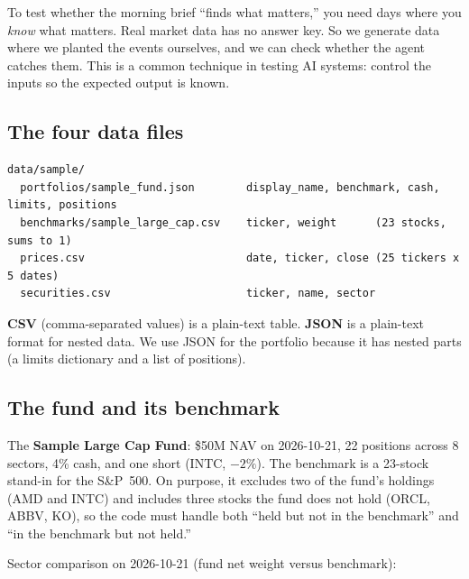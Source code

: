 \documentclass[11pt]{article}
\begin{document}
To test whether the morning brief ``finds what matters,'' you need days where you
\emph{know} what matters. Real market data has no answer key. So we generate data where we
planted the events ourselves, and we can check whether the agent catches them. This is a common
technique in testing AI systems: control the inputs so the expected output is known.

\subsection{The four data files}

\begin{lstlisting}[style=plain]
data/sample/
  portfolios/sample_fund.json        display_name, benchmark, cash, limits, positions
  benchmarks/sample_large_cap.csv    ticker, weight      (23 stocks, sums to 1)
  prices.csv                         date, ticker, close (25 tickers x 5 dates)
  securities.csv                     ticker, name, sector
\end{lstlisting}

\textbf{CSV} (comma-separated values) is a plain-text table. \textbf{JSON} is a plain-text
format for nested data. We use JSON for the portfolio because it has nested parts (a limits
dictionary and a list of positions).

\subsection{The fund and its benchmark}

The \textbf{Sample Large Cap Fund}: \$50M NAV on 2026-10-21, 22 positions across 8 sectors,
4\% cash, and one short (INTC, $-2\%$). The benchmark is a 23-stock stand-in for the S\&P~500.
On purpose, it excludes two of the fund's holdings (AMD and INTC) and includes three stocks the
fund does not hold (ORCL, ABBV, KO), so the code must handle both ``held but not in the
benchmark'' and ``in the benchmark but not held.''

Sector comparison on 2026-10-21 (fund net weight versus benchmark):
\end{document}
